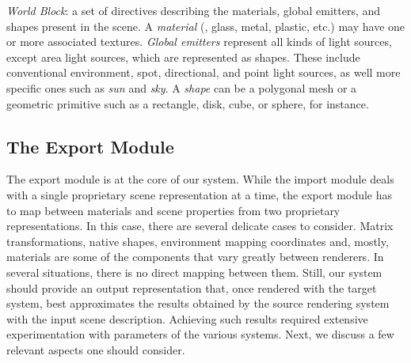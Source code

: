 \noindent \textit{World Block}:
a set of directives describing the materials, global emitters, and shapes present in the scene.
%
A {\it material} (\eg, glass, metal, plastic, etc.) may have one or more associated textures. {\it Global emitters} represent all kinds of light sources, except area light sources, which are represented as shapes. These include conventional environment, spot, directional, and point light sources, as well more specific ones such as {\it sun} and {\it sky}.
%
A {\it shape} can be a polygonal mesh or a geometric primitive such as a rectangle, disk, cube, or sphere, for instance. 





\subsection{The Export Module}

The export module is at the core of our system. While the import module deals with a single proprietary scene representation at a time, the export module has to map between materials and scene properties from two proprietary representations. 
In this case, there are several delicate cases to
consider. Matrix transformations, native shapes, environment mapping coordinates and, mostly, materials are
some of the components that vary greatly between renderers. 
In several situations, there is no direct mapping between them. Still, our system should provide an output representation that, once rendered with the target system, best approximates the results obtained by the source rendering system with the input scene description. 
Achieving such results required extensive experimentation with parameters of the various systems. Next, we discuss a few relevant aspects one should consider.    
  
